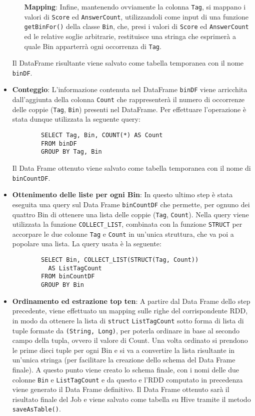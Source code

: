 \begin{itemize}
\begin{itemize}
          \textbf{Mapping}:
          Infine, mantenendo ovviamente la colonna \texttt{Tag}, si mappano i valori di \texttt{Score} ed \texttt{AnswerCount}, utilizzandoli come input di una funzione
          \texttt{getBinFor()} della classe \texttt{Bin}, che, presi i valori di \texttt{Score} ed \texttt{AnswerCount} ed le relative %
          soglie arbitrarie, restituisce una stringa che esprimerà a quale Bin apparterrà ogni occorrenza di \texttt{Tag}.
    \end{itemize}
    Il DataFrame risultante viene salvato come tabella temporanea con il nome \texttt{binDF}.
    \item
      \textbf{Conteggio}:
      L'informazione contenuta nel DataFrame \texttt{binDF} viene arricchita dall'aggiunta
      della colonna \texttt{Count} che rappresenterà il numero di occorrenze delle coppie (\texttt{Tag}, \texttt{Bin}) presenti
      nel DataFrame.
      Per effettuare l'operazione è stata dunque utilizzata la seguente query:
      \begin{verbatim}
        SELECT Tag, Bin, COUNT(*) AS Count
        FROM binDF
        GROUP BY Tag, Bin
      \end{verbatim}

      Il Data Frame ottenuto viene salvato come tabella temporanea con il nome di \texttt{binCountDF}.
    \item
      \textbf{Ottenimento delle liste per ogni Bin}:
      In questo ultimo step è stata eseguita una query sul Data Frame
      \texttt{binCountDF} che permette, per ognuno dei quattro Bin di ottenere una lista delle coppie (\texttt{Tag}, \texttt{Count}).
      Nella query viene utilizzata la funzione \texttt{COLLECT\_LIST}, combinata con la funzione \texttt{STRUCT} per accorpare
      le due colonne \texttt{Tag} e \texttt{Count} in un'unica struttura, che va poi a popolare una lista.
      La query usata è la seguente:
      \begin{verbatim}
        SELECT Bin, COLLECT_LIST(STRUCT(Tag, Count))
          AS ListTagCount
        FROM binCountDF
        GROUP BY Bin
      \end{verbatim}

    \item
      \textbf{Ordinamento ed estrazione top ten}:
      A partire dal Data Frame dello step precedente, viene effettuato un
      mapping sulle righe del corrispondente RDD, in modo da ottenere la lista di \texttt{struct} \texttt{ListTagCount} sotto forma
      di lista di tuple formate da \texttt{(String, Long)}, per poterla ordinare in base al secondo campo della tupla, ovvero
      il valore di Count.
      Una volta ordinato si prendono le prime dieci tuple per ogni Bin e si va a convertire la lista risultante in un'unica stringa
      (per facilitare la creazione dello schema del Data Frame finale).
      A questo punto viene creato lo schema finale, con i nomi delle due colonne \texttt{Bin} e \texttt{ListTagCount} e da questo
      e l'RDD computato in precedenza viene generato il Data Frame definitivo.
      Il Data Frame ottenuto sarà il risultato finale del Job e viene salvato come tabella su Hive tramite il metodo
      \texttt{saveAsTable()}. %
  \end{itemize}

